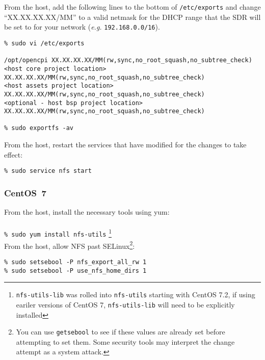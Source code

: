 From the host, add the following lines to the bottom of \texttt{/etc/exports} and change ``XX.XX.XX.XX/MM'' to a valid netmask for the DHCP range that the SDR will be set to for your network (\textit{e.g.} \texttt{192.168.0.0/16}).
\begin{verbatim}
% sudo vi /etc/exports

/opt/opencpi XX.XX.XX.XX/MM(rw,sync,no_root_squash,no_subtree_check)
<host core project location> XX.XX.XX.XX/MM(rw,sync,no_root_squash,no_subtree_check)
<host assets project location> XX.XX.XX.XX/MM(rw,sync,no_root_squash,no_subtree_check)
<optional - host bsp project location> XX.XX.XX.XX/MM(rw,sync,no_root_squash,no_subtree_check)

% sudo exportfs -av
\end{verbatim}

From the host, restart the services that have modified for the changes to take effect:
\begin{verbatim}
% sudo service nfs start
\end{verbatim}

\subsubsection{CentOS~7}
From the host, install the necessary tools using yum:\\
~\\
\verb+% sudo yum install nfs-utils+ \footnote{\texttt{nfs-utils-lib} was rolled into \texttt{nfs-utils} starting with CentOS 7.2, if using eariler versions of CentOS 7, \texttt{nfs-utils-lib} will need to be explicitly installed}
~\\

From the host, allow NFS past SELinux\footnote{You can use \texttt{getsebool} to see if these values are already set before attempting to set them. Some security tools may interpret the change attempt as a system attack.}:
\begin{verbatim}
% sudo setsebool -P nfs_export_all_rw 1
% sudo setsebool -P use_nfs_home_dirs 1
\end{verbatim}

